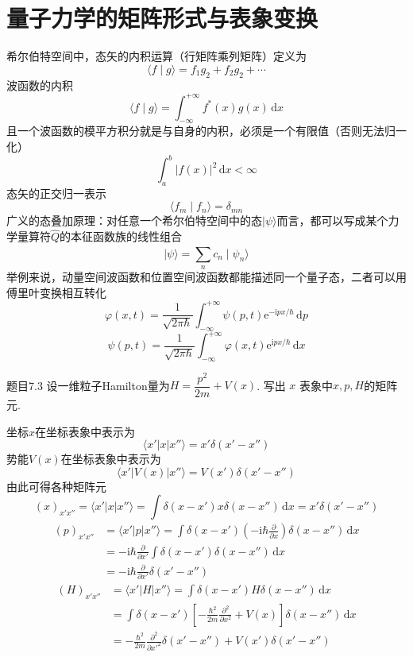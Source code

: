 \section{量子力学的矩阵形式与表象变换}
希尔伯特空间中，态矢的内积运算（行矩阵乘列矩阵）定义为
$$
    \langle f \mid g \rangle=f_1g_2+f_2g_2+\cdots
$$
波函数的内积
$$
    \langle f \mid g \rangle=\int_{-\infty}^{+\infty}f^*(x)g(x)\,\mathrm{d}x
$$
且一个波函数的模平方积分就是与自身的内积，必须是一个有限值（否则无法归一化）
$$
    \int_{a}^{b}|f(x)|^2\,\mathrm{d}x < \infty
$$
态矢的正交归一表示
$$
    \langle f_m \mid f_n \rangle=\delta_{mn}
$$
广义的态叠加原理：对任意一个希尔伯特空间中的态$\mid\psi\rangle$而言，都可以写成某个力学量算符$\hat{Q}$的本征函数族的线性组合
$$
    \mid\psi\rangle = \sum_{n}^{}c_n\mid\psi_n\rangle
$$
举例来说，动量空间波函数和位置空间波函数都能描述同一个量子态，二者可以用傅里叶变换相互转化
$$
    \varphi(x, t)=\frac{1}{\sqrt{2\pi\hbar}}\int_{-\infty}^{+\infty}\psi(p, t)\mathrm{e}^{-\mathrm{i}px/\hbar}\,\mathrm{d}p
$$
$$
    \psi(p, t)=\frac{1}{\sqrt{2\pi\hbar}}\int_{-\infty}^{+\infty}\varphi(x, t)\mathrm{e}^{\mathrm{i}px/\hbar}\,\mathrm{d}x
$$
\begin{question}{题目7.3}
    设一维粒子Hamilton量为$H=\dfrac{p^2}{2m}+V(x)$. 写出 $x$ 表象中$x,p,H$的矩阵元.
\end{question}
\begin{solution}
    坐标$x$在坐标表象中表示为
    $$
        \langle x'|x|x'' \rangle = x'\delta(x'-x'')
    $$
    势能$V(x)$在坐标表象中表示为
    $$
        \langle x'|V(x)|x'' \rangle = V(x')\delta(x'-x'')
    $$
    由此可得各种矩阵元
    $$
        (x)_{x'x''} = \langle x'|x|x'' \rangle
        = \int\delta(x-x')x\delta(x-x'')\,\mathrm{d}x
        = x'\delta(x'-x'')
    $$
    $$
        \begin{aligned}
            (p)_{x'x''}
             & = \langle x'|p|x'' \rangle = \int\delta(x-x')\left(-\mathrm{i}\hbar\frac{\partial }{\partial x}\right)\delta(x-x'')\,\mathrm{d}x \\
             & = -\mathrm{i}\hbar\frac{\partial }{\partial x'}\int\delta(x-x')\delta(x-x'')\,\mathrm{d}x                                        \\
             & = -\mathrm{i}\hbar\frac{\partial }{\partial x'}\delta(x'-x'')
        \end{aligned}
    $$
    $$
        \begin{aligned}
            (H)_{x'x''}
             & =\langle x'|H|x'' \rangle =\int\delta(x-x')H\delta(x-x'')\,\mathrm{d}x                                          \\
             & =\int\delta(x-x')\left[-\frac{\hbar^2}{2m}\frac{\partial^2}{\partial x^2}+V(x)\right]\delta(x-x'')\,\mathrm{d}x \\
             & =-\frac{\hbar^2}{2m}\frac{\partial^2}{\partial x'^2}\delta(x'-x'') + V(x')\delta(x'-x'')                        \\
        \end{aligned}
    $$
\end{solution}


